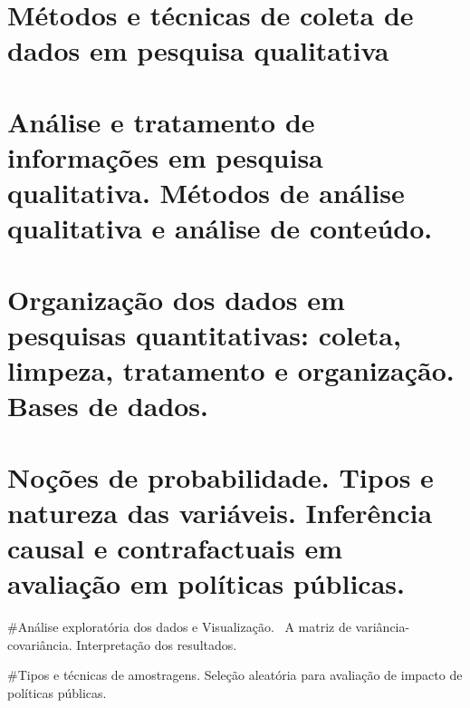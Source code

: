 \documentclass[
]{book}
\begin{document}
\hypertarget{muxe9todos-e-tuxe9cnicas-de-coleta-de-dados-em-pesquisa-qualitativa}{%
\chapter{Métodos e técnicas de coleta de dados em pesquisa qualitativa}\label{muxe9todos-e-tuxe9cnicas-de-coleta-de-dados-em-pesquisa-qualitativa}}

\hypertarget{anuxe1lise-e-tratamento-de-informauxe7uxf5es-em-pesquisa-qualitativa.-muxe9todos-de-anuxe1lise-qualitativa-e-anuxe1lise-de-conteuxfado.}{%
\chapter{Análise e tratamento de informações em pesquisa qualitativa. Métodos de análise qualitativa e análise de conteúdo.}\label{anuxe1lise-e-tratamento-de-informauxe7uxf5es-em-pesquisa-qualitativa.-muxe9todos-de-anuxe1lise-qualitativa-e-anuxe1lise-de-conteuxfado.}}

\hypertarget{organizauxe7uxe3o-dos-dados-em-pesquisas-quantitativas-coleta-limpeza-tratamento-e-organizauxe7uxe3o.-bases-de-dados.}{%
\chapter{Organização dos dados em pesquisas quantitativas: coleta, limpeza, tratamento e organização. Bases de dados.}\label{organizauxe7uxe3o-dos-dados-em-pesquisas-quantitativas-coleta-limpeza-tratamento-e-organizauxe7uxe3o.-bases-de-dados.}}

\hypertarget{nouxe7uxf5es-de-probabilidade.-tipos-e-natureza-das-variuxe1veis.-inferuxeancia-causal-e-contrafactuais-em-avaliauxe7uxe3o-em-poluxedticas-puxfablicas.}{%
\chapter{Noções de probabilidade. Tipos e natureza das variáveis. Inferência causal e contrafactuais em avaliação em políticas públicas.}\label{nouxe7uxf5es-de-probabilidade.-tipos-e-natureza-das-variuxe1veis.-inferuxeancia-causal-e-contrafactuais-em-avaliauxe7uxe3o-em-poluxedticas-puxfablicas.}}

\#Análise exploratória dos dados e Visualização.~ A matriz de variância-covariância. Interpretação dos resultados.

\#Tipos e técnicas de amostragens. Seleção aleatória para avaliação de impacto de políticas públicas.
\end{document}

